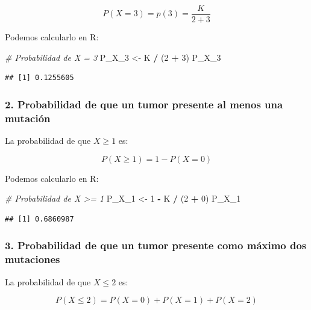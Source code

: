 \documentclass[
]{article}
\newenvironment{Shaded}{\begin{snugshade}}{\end{snugshade}}
\newcommand{\CommentTok}[1]{\textcolor[rgb]{0.56,0.35,0.01}{\textit{#1}}}
\newcommand{\DecValTok}[1]{\textcolor[rgb]{0.00,0.00,0.81}{#1}}
\newcommand{\NormalTok}[1]{#1}
\newcommand{\OtherTok}[1]{\textcolor[rgb]{0.56,0.35,0.01}{#1}}
\newcommand{\SpecialCharTok}[1]{\textcolor[rgb]{0.81,0.36,0.00}{\textbf{#1}}}
\begin{document}
\[
P(X = 3) = p(3) = \frac{K}{2+3}
\]

Podemos calcularlo en R:

\begin{Shaded}
\begin{Highlighting}[]
\CommentTok{\# Probabilidad de X = 3}
\NormalTok{P\_X\_3 }\OtherTok{\textless{}{-}}\NormalTok{ K }\SpecialCharTok{/}\NormalTok{ (}\DecValTok{2} \SpecialCharTok{+} \DecValTok{3}\NormalTok{)}
\NormalTok{P\_X\_3}
\end{Highlighting}
\end{Shaded}

\begin{verbatim}
## [1] 0.1255605
\end{verbatim}

\subsubsection{2. Probabilidad de que un tumor presente al menos una mutación}\label{probabilidad-de-que-un-tumor-presente-al-menos-una-mutaciuxf3n}

La probabilidad de que \(X \geq 1\) es:

\[
P(X \geq 1) = 1 - P(X = 0)
\]

Podemos calcularlo en R:

\begin{Shaded}
\begin{Highlighting}[]
\CommentTok{\# Probabilidad de X \textgreater{}= 1}
\NormalTok{P\_X\_1 }\OtherTok{\textless{}{-}} \DecValTok{1} \SpecialCharTok{{-}}\NormalTok{ K }\SpecialCharTok{/}\NormalTok{ (}\DecValTok{2} \SpecialCharTok{+} \DecValTok{0}\NormalTok{)}
\NormalTok{P\_X\_1}
\end{Highlighting}
\end{Shaded}

\begin{verbatim}
## [1] 0.6860987
\end{verbatim}

\subsubsection{3. Probabilidad de que un tumor presente como máximo dos mutaciones}\label{probabilidad-de-que-un-tumor-presente-como-muxe1ximo-dos-mutaciones}

La probabilidad de que \(X \leq 2\) es:

\[
P(X \leq 2) = P(X = 0) + P(X = 1) + P(X = 2)
\]
\end{document}
